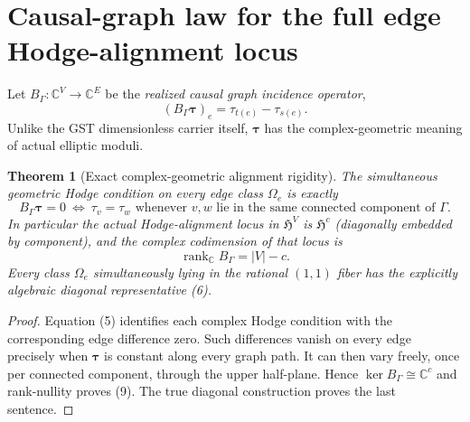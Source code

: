 \documentclass[11pt]{article}
\newtheorem{theorem}{Theorem}
\begin{document}
\section{Causal-graph law for the full edge Hodge-alignment locus}
Let $B_\Gamma:\mathbb C^V\to\mathbb C^E$ be the
\emph{realized causal graph incidence operator},
\[
 (B_\Gamma\boldsymbol\tau)_e
       =\tau_{t(e)}-\tau_{s(e)}.                          \tag{7}
\]
Unlike the GST dimensionless carrier itself,
$\boldsymbol\tau$ has the complex-geometric meaning
of actual elliptic moduli.

\begin{theorem}[Exact complex-geometric alignment rigidity]
The simultaneous geometric Hodge condition on every
edge class $\Omega_e$ is \emph{exactly}
\[
 \boxed{
  B_\Gamma\boldsymbol\tau=0
   \ \Longleftrightarrow\
  \tau_v=\tau_w
   \text{ whenever }v,w\text{ lie in the same connected
    component of }\Gamma.
 }                                                        \tag{8}
\]
In particular the actual Hodge-alignment locus in
$\mathfrak H^V$ is
$\mathfrak H^{c}$ (diagonally embedded by component),
and the complex codimension of that locus is
\[
 \boxed{\operatorname{rank}_{\mathbb C}B_\Gamma=|V|-c.}  \tag{9}
\]
Every class $\Omega_e$ simultaneously lying in the
rational $(1,1)$ fiber has the explicitly algebraic
diagonal representative (6).
\end{theorem}
\begin{proof}
Equation (5) identifies each complex Hodge condition
with the corresponding edge difference zero.
Such differences vanish on every edge precisely
when $\boldsymbol\tau$ is constant along every graph
path. It can then vary freely, once per connected
component, through the upper half-plane.
Hence $\ker B_\Gamma\cong\mathbb C^c$
and rank-nullity proves (9).
The true diagonal construction proves the last
sentence.
\end{proof}
\end{document}
